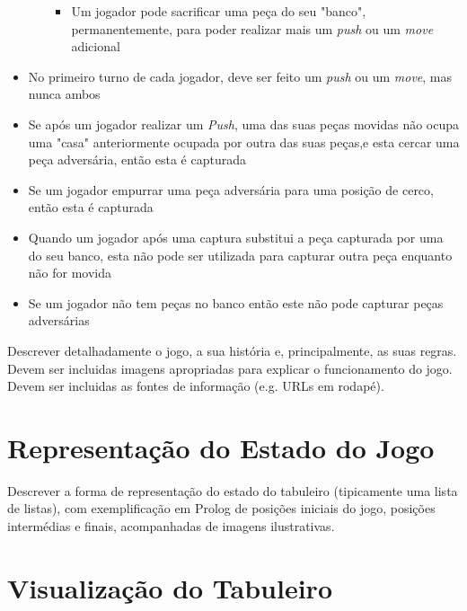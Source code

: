 \documentclass[a4paper]{article}
\begin{document}
\begin{itemize}
\begin{itemize}
				\begin{itemize}
					\item Um jogador pode sacrificar uma peça do seu "banco", permanentemente, para poder realizar mais um \textit{push} ou um \textit{move} adicional
				\end{itemize}
			\end{itemize}
	\item No primeiro turno de cada jogador, deve ser feito um \textit{push} ou um \textit{move}, mas nunca ambos
	\item Se após um jogador realizar um \textit{Push}, uma das suas peças movidas não ocupa uma "casa" anteriormente ocupada por outra das suas peças,e esta cercar uma peça adversária, então esta é capturada
	\item Se um jogador empurrar uma peça adversária para uma posição de cerco, então esta é capturada
	\item Quando um jogador após uma captura substitui a peça capturada por uma do seu banco, esta não pode ser utilizada para capturar outra peça enquanto não for movida
	\item Se um jogador não tem peças no banco então este não pode capturar peças adversárias
\end{itemize}

Descrever detalhadamente o jogo, a sua história e, principalmente, as suas regras.
Devem ser incluidas imagens apropriadas para explicar o funcionamento do jogo.
Devem ser incluidas as fontes de informação (e.g. URLs em rodapé).


\section{Representação do Estado do Jogo}

Descrever a forma de representação do estado do tabuleiro (tipicamente uma lista de listas), com exemplificação em Prolog de posições iniciais do jogo, posições intermédias e finais, acompanhadas de imagens ilustrativas.


\section{Visualização do Tabuleiro}
\end{document}

